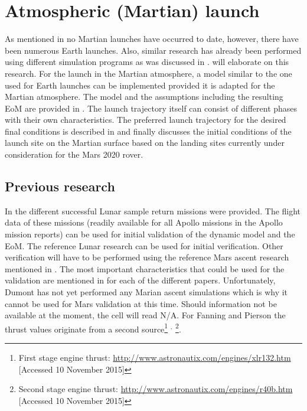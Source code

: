 \chapter{Atmospheric (Martian) launch} %
\label{ch:launch}
As mentioned in  no Martian launches have occurred to date, however, there have been numerous Earth launches. Also, similar research has already been performed using different simulation programs as was discussed in .  will elaborate on this research. For the launch in the Martian atmosphere, a model similar to the one used for Earth launches can be implemented provided it is adapted for the Martian atmosphere. The model and the assumptions including the resulting \ac{EoM} are provided in . The launch trajectory itself can consist of different phases with their own characteristics. The preferred launch trajectory for the desired final conditions is described in  and finally  discusses the initial conditions of the launch site on the Martian surface based on the landing sites currently under consideration for the Mars 2020 rover.




\section{Previous research}
\label{sec:prevreslaunch}
In  the different successful Lunar sample return missions were provided. The flight data of these missions (readily available for all Apollo missions in the Apollo mission reports) can be used for initial validation of the dynamic model and the \ac{EoM}. The reference Lunar research can be used for initial verification. Other verification will have to be performed using the reference Mars ascent research mentioned in  . The most important characteristics that could be used for the validation are mentioned in  for each of the different papers.  Unfortunately, Dumont \cite{dumont2015design} has not yet performed any Marian ascent simulations which is why it cannot be used for Mars validation at this time. Should information not be available at the moment, the cell will read \ac{N/A}. For Fanning and Pierson the thrust values originate from a second source\footnote{\label{foot:firsteng} First stage engine thrust: \url{http://www.astronautix.com/engines/xlr132.htm} [Accessed 10 November 2015]} $^{,}$ \footnote{\label{foot:secondeng} Second stage engine thrust: \url{http://www.astronautix.com/engines/r40b.htm} [Accessed 10 November 2015]}.


